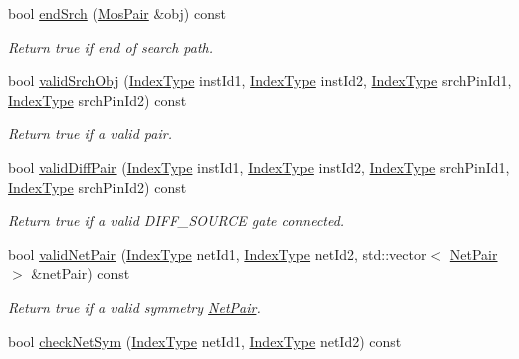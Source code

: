 \begin{DoxyCompactItemize}
bool \hyperlink{classSymDetect_ac46824a93f71489b6c9f1aec961a0f8d}{end\+Srch} (\hyperlink{classMosPair}{Mos\+Pair} \&obj) const
\begin{DoxyCompactList}\small\item\em Return true if end of search path. \end{DoxyCompactList}\item 
bool \hyperlink{classSymDetect_ad4636f69ae0cad2fc23be2472c59ff4c}{valid\+Srch\+Obj} (\hyperlink{type_8h_a581e8093e28e7362f2b6937296190676}{Index\+Type} inst\+Id1, \hyperlink{type_8h_a581e8093e28e7362f2b6937296190676}{Index\+Type} inst\+Id2, \hyperlink{type_8h_a581e8093e28e7362f2b6937296190676}{Index\+Type} srch\+Pin\+Id1, \hyperlink{type_8h_a581e8093e28e7362f2b6937296190676}{Index\+Type} srch\+Pin\+Id2) const
\begin{DoxyCompactList}\small\item\em Return true if a valid pair. \end{DoxyCompactList}\item 
bool \hyperlink{classSymDetect_a1153c5f98df1f6dde97ed3335367bb66}{valid\+Diff\+Pair} (\hyperlink{type_8h_a581e8093e28e7362f2b6937296190676}{Index\+Type} inst\+Id1, \hyperlink{type_8h_a581e8093e28e7362f2b6937296190676}{Index\+Type} inst\+Id2, \hyperlink{type_8h_a581e8093e28e7362f2b6937296190676}{Index\+Type} srch\+Pin\+Id1, \hyperlink{type_8h_a581e8093e28e7362f2b6937296190676}{Index\+Type} srch\+Pin\+Id2) const
\begin{DoxyCompactList}\small\item\em Return true if a valid D\+I\+F\+F\+\_\+\+S\+O\+U\+R\+CE gate connected. \end{DoxyCompactList}\item 
bool \hyperlink{classSymDetect_a455e5f585e60c484e2d093a44775faf5}{valid\+Net\+Pair} (\hyperlink{type_8h_a581e8093e28e7362f2b6937296190676}{Index\+Type} net\+Id1, \hyperlink{type_8h_a581e8093e28e7362f2b6937296190676}{Index\+Type} net\+Id2, std\+::vector$<$ \hyperlink{classNetPair}{Net\+Pair} $>$ \&net\+Pair) const
\begin{DoxyCompactList}\small\item\em Return true if a valid symmetry \hyperlink{classNetPair}{Net\+Pair}. \end{DoxyCompactList}\item 
bool \hyperlink{classSymDetect_a6672756986d958695756a1fa2c76577d}{check\+Net\+Sym} (\hyperlink{type_8h_a581e8093e28e7362f2b6937296190676}{Index\+Type} net\+Id1, \hyperlink{type_8h_a581e8093e28e7362f2b6937296190676}{Index\+Type} net\+Id2) const

\end{DoxyCompactItemize}
